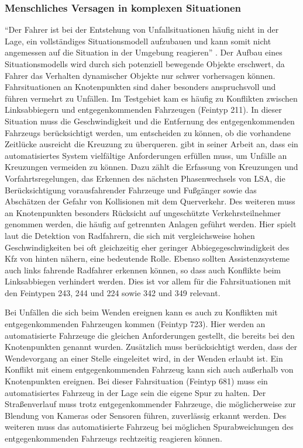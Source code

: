 \subsubsection{Menschliches Versagen in komplexen Situationen}
\enquote{Der Fahrer ist bei der Entstehung von Unfallsituationen häufig nicht in der Lage, ein vollständiges Situationsmodell aufzubauen und kann somit nicht angemessen auf die Situation in der Umgebung reagieren} \parencite[S. 48]{Zademach.24.09.2015}. Der Aufbau eines Situationsmodells wird durch sich potenziell bewegende Objekte erschwert, da Fahrer das Verhalten dynamischer Objekte nur schwer vorhersagen können. Fahrsituationen an Knotenpunkten sind daher besonders anspruchsvoll und führen vermehrt zu Unfällen. Im Testgebiet kam es häufig zu Konflikten zwischen Linksabbiegern und entgegenkommenden Fahrzeugen (Feintyp 211). In dieser Situation muss die Geschwindigkeit und die Entfernung des entgegenkommenden Fahrzeugs berücksichtigt werden, um entscheiden zu können, ob die vorhandene Zeitlücke ausreicht die Kreuzung zu überqueren. \Textcite[S. 9]{Mages.2008} gibt in seiner Arbeit an, dass ein automatisiertes System vielfältige Anforderungen erfüllen muss, um Unfälle an Kreuzungen vermeiden zu können. Dazu zählt die Erfassung von Kreuzungen und Vorfahrtsregelungen, das Erkennen des nächsten Phasenwechsels von LSA, die Berücksichtigung vorausfahrender Fahrzeuge und Fußgänger sowie das Abschätzen der Gefahr von Kollisionen mit dem Querverkehr. Des weiteren muss an Knotenpunkten besonders Rücksicht auf ungeschützte Verkehrsteilnehmer genommen werden, die häufig auf getrennten Anlagen geführt werden. Hier spielt laut \Textcite[S. 310]{Schreiber.2014b} die Detektion von Radfahrern, die sich mit vergleichsweise hohen Geschwindigkeiten bei oft gleichzeitig eher geringer Abbiegegeschwindigkeit des Kfz von hinten nähern, eine bedeutende Rolle. Ebenso sollten Assistenzsysteme auch links fahrende Radfahrer erkennen können, so dass auch Konflikte beim Linksabbiegen verhindert werden. Dies ist vor allem für die Fahrsituationen mit den Feintypen 243, 244 und 224 sowie 342 und 349 relevant.

Bei Unfällen die sich beim Wenden ereignen kann es auch zu Konflikten mit entgegenkommenden Fahrzeugen kommen (Feintyp 723). Hier werden an automatisierte Fahrzeuge die gleichen Anforderungen gestellt, die bereits bei den Knotenpunkten genannt wurden. Zusätzlich muss berücksichtigt werden, dass der Wendevorgang an einer Stelle eingeleitet wird, in der Wenden erlaubt ist. Ein Konflikt mit einem entgegenkommenden Fahrzeug kann sich auch außerhalb von Knotenpunkten ereignen. Bei dieser Fahrsituation (Feintyp 681) muss ein automatisiertes Fahrzeug in der Lage sein die eigene Spur zu halten. Der Straßenverlauf muss trotz entgegenkommender Fahrzeuge, die möglicherweise zur Blendung von Kameras oder Sensoren führen, zuverlässig erkannt werden. Des weiteren muss das automatisierte Fahrzeug bei möglichen Spurabweichungen des entgegenkommenden Fahrzeugs rechtzeitig reagieren können.

